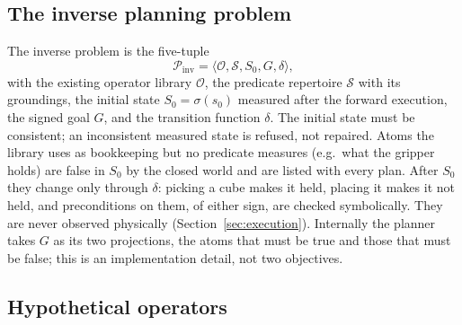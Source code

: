 \subsection{The inverse planning problem}
\label{sec:problem}

The inverse problem is the five-tuple
\begin{equation}
  \mathcal{P}_{\mathrm{inv}}=\langle \mathcal{O},\mathcal{S},S_0,G,\delta\rangle,
\end{equation}
with the existing operator library $\mathcal{O}$, the predicate repertoire
$\mathcal{S}$ with its groundings, the initial state $S_0=\sigma(s_0)$ measured after
the forward execution, the signed goal $G$, and the transition function $\delta$.
The initial state must be consistent; an inconsistent measured state is refused, not
repaired. Atoms the library uses as bookkeeping but no predicate measures (e.g.\ what the
gripper holds) are false in $S_0$ by the closed world and are listed with every plan.
After $S_0$ they change only through $\delta$: picking a cube makes it held, placing it
makes it not held, and preconditions on them, of either sign, are checked
symbolically. They are never observed physically (Section~\ref{sec:execution}).
Internally the planner takes $G$ as its two projections, the atoms that must be true
and those that must be false; this is an implementation detail, not two objectives.

\subsection{Hypothetical operators}
\label{sec:holes}

